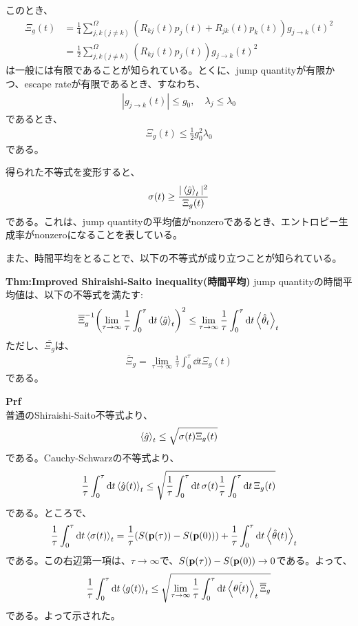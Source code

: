 \documentclass[a4paper,11pt]{jsarticle}
\numberwithin{equation}{section}
\begin{document}
このとき、
\begin{align}
    \Xi_g(t) &= \frac{1}{4}\sum_{j,k(j \neq k)}^{\Omega}(R_{kj}(t)p_j(t)+R_{jk}(t)p_k(t))g_{j \to k}(t)^2\\
    &= \frac{1}{2}\sum_{j,k(j \neq k)}^{\Omega}(R_{kj}(t)p_j(t))g_{j \to k}(t)^2
\end{align}
は一般には有限であることが知られている。とくに、jump quantityが有限かつ、escape rateが有限であるとき、すなわち、
\begin{align}
    |g_{j \to k}(t)| \leq g_0 ,\quad \lambda_j \leq \lambda_0
\end{align}
であるとき、
\begin{align}
    \Xi_g(t) \leq \frac{1}{2}g_0^2\lambda_0
\end{align}
である。

得られた不等式を変形すると、
\begin{align}
    \sigma(t) \geq \frac{|\ev{\hat{g}}_t|^2}{\Xi_g(t)}
\end{align}
である。これは、jump quantityの平均値がnonzeroであるとき、エントロピー生成率がnonzeroになることを表している。

また、時間平均をとることで、以下の不等式が成り立つことが知られている。
\begin{itembox}[l]{\textbf{Thm:Improved Shiraishi-Saito inequality(時間平均)}}
    jump quantityの時間平均値は、以下の不等式を満たす:
    \begin{align}
      \overline{\Xi}_g ^{-1}\qty(\lim_{\tau \to \infty}\frac{1}{\tau}\int_0^{\tau} \dd{t}\ev{\hat{g}}_t)^2 \leq \lim_{\tau \to \infty}\frac{1}{\tau}\int_0^{\tau} \dd{t}\ev{\hat{\theta}_t}_t
    \end{align}
    ただし、$\overline{\Xi_g}$は、
    \begin{align}
      \overline{\Xi}_g = \lim_{\tau \to \infty}\frac{1}{\tau}\int_0^{\tau} \dd{t}\Xi_g(t)
    \end{align}
    である。

\end{itembox}
\textbf{Prf}\\
普通のShiraishi-Saito不等式より、
\begin{align}
  \ev{\hat{g}}_t \leq \sqrt{\sigma(t)\Xi_g(t)}
\end{align}
である。Cauchy-Schwarzの不等式より、
\begin{align}
  \frac{1}{\tau}\int_0^{\tau} \dd{t}\ev{\hat{g}(t)}_t \leq \sqrt{\frac{1}{\tau}\int_0^{\tau} \dd{t}\sigma(t) \frac{1}{\tau}\int_0^{\tau} \dd{t} \Xi_g(t)}
\end{align}
である。ところで、
\begin{align}
  \frac{1}{\tau}\int_0^{\tau} \dd{t}\ev{\sigma(t)}_t &= \frac{1}{\tau}(S(\vb{p}(\tau)) - S(\vb{p}(0))) + \frac{1}{\tau}\int_0^{\tau} \dd{t}\ev{\hat{\theta}(t)}_t
\end{align}
である。この右辺第一項は、$\tau \to \infty$で、$S(\vb{p}(\tau)) - S(\vb{p}(0)) \to 0$である。よって、
\begin{align}
  \frac{1}{\tau}\int_0^{\tau} \dd{t}\ev{g(t)}_t \leq \sqrt{\lim_{\tau \to \infty}\frac{1}{\tau}\int_0^{\tau} \dd{t}\ev{\hat{\theta(t)}}_t \overline{\Xi}_g}
\end{align}
である。よって示された。\qedsymbol\\
\end{document}
